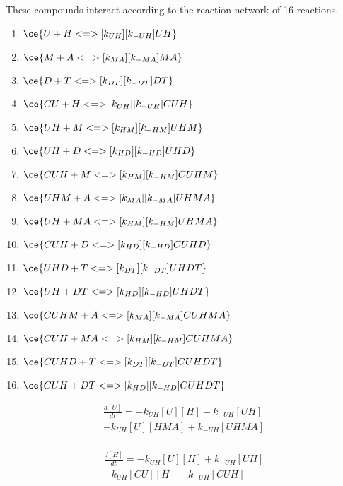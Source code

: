 These compounds interact according to the reaction network of 16 reactions. 

\begin{enumerate}
\item $\ce{U + H <=>[k_{UH}][k_{-UH}] UH}$ %
\item $\ce{M + A <=>[k_{MA}][k_{-MA}] MA}$ %
\item $\ce{D + T <=>[k_{DT}][k_{-DT}] DT}$ %

\item $\ce{CU + H <=>[k_{UH}][k_{-UH}] CUH}$ %
\item $\ce{UH + M <=>[k_{HM}][k_{-HM}] UHM}$ %
\item $\ce{UH + D <=>[k_{HD}][k_{-HD}] UHD}$ %

\item $\ce{CUH + M <=>[k_{HM}][k_{-HM}] CUHM}$ %
\item $\ce{UHM + A <=>[k_{MA}][k_{-MA}] UHMA}$ %
\item $\ce{UH + MA <=>[k_{HM}][k_{-HM}] UHMA}$ %
\item $\ce{CUH + D <=>[k_{HD}][k_{-HD}] CUHD}$ %
\item $\ce{UHD + T <=>[k_{DT}][k_{-DT}] UHDT}$ %
\item $\ce{UH + DT <=>[k_{HD}][k_{-HD}] UHDT}$ %

\item $\ce{CUHM + A <=>[k_{MA}][k_{-MA}] CUHMA}$ %
\item $\ce{CUH + MA <=>[k_{HM}][k_{-HM}] CUHMA}$ %
\item $\ce{CUHD + T <=>[k_{DT}][k_{-DT}] CUHDT}$ %
\item $\ce{CUH + DT <=>[k_{HD}][k_{-HD}] CUHDT}$ %
\end{enumerate}

\begin{equation}
\begin{split}
\frac{d[U]}{dt} = - k_{UH}[U][H] + k_{-UH}[UH]\\ %
                  - k_{UH}[U][HMA] + k_{-UH}[UHMA] \\%
\end{split}
\end{equation}

\begin{equation}
\begin{split}
\frac{d[H]}{dt} = - k_{UH}[U][H] + k_{-UH}[UH] \\%
                  - k_{UH}[CU][H] + k_{-UH}[CUH] \\%
\end{split}
\end{equation}

